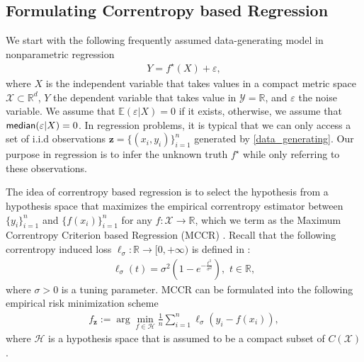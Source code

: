 \documentclass[11pt]{article}
\begin{document}
\subsection{Formulating Correntropy based Regression}
We start with the following frequently assumed data-generating model in nonparametric regression
\begin{align}\label{data_generating}
Y=f^\star(X)+\varepsilon,
\end{align}
where $X$ is the independent variable that takes values in a compact metric space $\mathcal{X}\subset\mathbb{R}^d$, $Y$ the dependent variable that takes value in $\mathcal{Y}=\mathbb{R}$, and $\varepsilon$ the noise variable. We assume that $\mathbb{E}(\varepsilon|X)=0$ if it exists, otherwise, we assume that ${\sf{median}}(\varepsilon|X)=0$. In regression problems, it is typical that we can only access a set of i.i.d observations $\mathbf{z}=\{(x_i,y_i)\}_{i=1}^n$ generated by \eqref{data_generating}. Our purpose in regression is to infer the unknown truth $f^\star$ while only referring to these observations.

The idea of correntropy based regression is to select the hypothesis from a hypothesis space that maximizes the empirical correntropy estimator between $\{y_i\}_{i=1}^n$ and $\{f(x_i)\}_{i=1}^n$ for any $f:\mathcal{X}\rightarrow\mathbb{R}$, which we term as the Maximum Correntropy Criterion based Regression (MCCR) \cite{fenglearning}. Recall that the following correntropy induced loss $\ell_\sigma: \mathbb{R} \rightarrow [0,+\infty)$ is defined in \cite{fenglearning}:
\begin{align}\label{loss_function}
\ell_\sigma(t)=\sigma^2\left(1-e^{-\frac{t^2}{\sigma^2}}\right),\,\,t\in\mathbb{R},
\end{align}
where $\sigma>0$ is a tuning parameter. MCCR can be formulated into the following empirical risk minimization scheme   
\begin{align}\label{LearningAlgorithmwithCIL}
f_\mathbf{z}:=\arg\min_{f\in\mathcal{H}}\frac{1}{n}\sum_{i=1}^n
\ell_\sigma(y_i-f(x_i)),
\end{align}
where $\mathcal{H}$ is a hypothesis space that is assumed to be a compact subset of $C(\mathcal{X})$.
\end{document}
